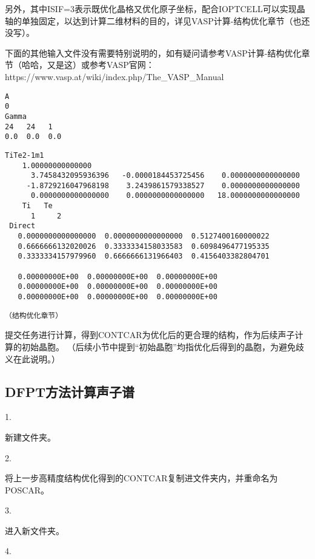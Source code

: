另外，其中ISIF=3表示既优化晶格又优化原子坐标，配合IOPTCELL可以实现晶轴的单独固定，以达到计算二维材料的目的，详见VASP计算-结构优化章节（也还没写）。

下面的其他输入文件没有需要特别说明的，如有疑问请参考VASP计算-结构优化章节（哈哈，又是这）或参考VASP官网：https://www.vasp.at/wiki/index.php/The\_VASP\_Manual

\begin{lstlisting}[caption=KPOINTS]
A
0
Gamma
24   24   1
0.0  0.0  0.0
\end{lstlisting}

\begin{lstlisting}[caption=POSCAR]
 TiTe2-1m1                               
    1.00000000000000     
      3.7458432095936396   -0.0000184453725456    0.0000000000000000
     -1.8729216047968198    3.2439861579338527    0.0000000000000000
      0.0000000000000000    0.0000000000000000   18.0000000000000000
    Ti   Te
      1     2
 Direct
   0.0000000000000000  0.0000000000000000  0.5127400160000022
   0.6666666132020026  0.3333334158033583  0.6098496477195335
   0.3333334157979960  0.6666666131966403  0.4156403382804701
  
   0.00000000E+00  0.00000000E+00  0.00000000E+00
   0.00000000E+00  0.00000000E+00  0.00000000E+00
   0.00000000E+00  0.00000000E+00  0.00000000E+00
\end{lstlisting}

\begin{lstlisting}[caption=POTCAR]
    （结构优化章节）
\end{lstlisting}

提交任务进行计算，得到CONTCAR为优化后的更合理的结构，作为后续声子计算的初始晶胞。
（后续小节中提到“初始晶胞”均指优化后得到的晶胞，为避免歧义在此说明。）

 
\subsection{DFPT方法计算声子谱}\label{sec:具体计算步骤-DFPT方法计算声子谱}

1.

新建文件夹。

2.

将上一步高精度结构优化得到的CONTCAR复制进文件夹内，并重命名为POSCAR。

3.

进入新文件夹。

4.

